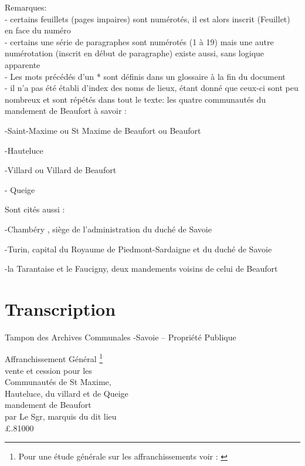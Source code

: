 \documentclass[a4paper,twoside,openany]{article}
\begin{document}
Remarques:
\\- certains feuillets (pages impaires) sont numérotés, il est alors inscrit (Feuillet) en face du numéro
\\- certains une série de paragraphes sont numérotés (1 à 19) mais une autre numérotation (inscrit en début de paragraphe) existe aussi, sans logique apparente
\\- Les mots précédés d'un * sont définis dans un glossaire à la fin du document
\\- il n'a pas été établi d'index des noms de lieux, étant donné que ceux-ci sont peu nombreux et sont répétés dans tout le texte:
les quatre communautés du mandement de Beaufort à savoir :
\begin{list}{}{\leftmargin 1cm}
\item -Saint-Maxime ou St Maxime de Beaufort ou Beaufort
\item -Hauteluce
\item -Villard ou Villard de Beaufort
\item - Queige
\end{list}
Sont cités aussi :
\begin{list}{}{\leftmargin 1cm}
\item -Chambéry , siège de l'administration du duché de Savoie
\item -Turin, capital du Royaume de Piedmont-Sardaigne et du duché de Savoie
\item -la Tarantaise et le Faucigny, deux mandements voisins de celui de Beaufort
\end{list}
\section{Transcription}


Tampon des Archives Communales -Savoie – Propriété Publique
\begin{flushright}
Affranchissement Général \footnote{Pour une étude générale sur les affranchissements voir : \cite{Bruchet}}
\\vente et cession pour les
\\Communautés de St Maxime,
\\Hauteluce, du villard et de Queige
\\mandement de Beaufort
\\ par Le Sgr, marquis du dit lieu 
\\£.81000
\end{flushright}
\end{document}
